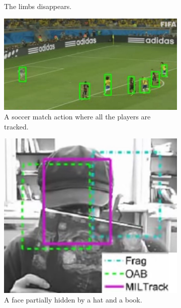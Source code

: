 \begin{figure}[!h]
\begin{subfigure}[!h]{0.19\textwidth}
		\caption{The limbs disappears.}
		\label{fig:challenge_blurred}
	\end{subfigure}
	\begin{subfigure}[!h]{0.49\textwidth}
		\includegraphics[width=\linewidth]{images/tracking/challenge_multiple}
		\captionsetup{margin=0.5cm}
		\caption{A soccer match action where all the players are tracked.}
		\label{fig:challenge_multiple}
	\end{subfigure}
	\begin{subfigure}[!h]{0.29\textwidth}
		\includegraphics[width=\linewidth]{images/tracking/challenge_partialOcclusion}
		\caption{A face partially hidden by a hat and a book.}
		\label{fig:challenge_partialOcclusion}
	\end{subfigure}
	\begin{subfigure}[!h]{0.49\textwidth}

\end{subfigure}
\end{figure}
